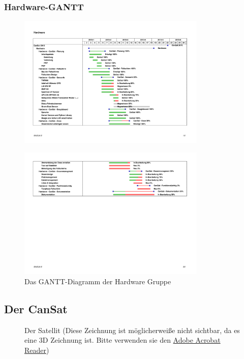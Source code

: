 \subsubsection {Hardware-GANTT}
\begin{figure}[htbp]
	\centering
	\includegraphics[trim = 10mm 50mm 20mm 65mm, clip,width=0.8\textwidth]{8_Anhang/hardware-gantt-1.png}
	\label{gantt_hardware_1}
\end{figure}
\vspace{-2cm}
\begin{figure}[htbp]
	\centering
	\includegraphics[trim = 11mm 350mm 20mm 40mm, clip,width=0.8\textwidth]{8_Anhang/hardware-gantt-2.png}
	\caption{Das GANTT-Diagramm der Hardware Gruppe}
	\label{gantt_hardware_2}
\end{figure}

\newpage
\subsection{Der CanSat}
\begin{figure}[h] 
      \centering 
      \caption{Der Satellit (Diese Zeichnung ist möglicherweiße nicht sichtbar, da es eine 3D Zeichnung ist. Bitte verwenden sie den \href{https://get.adobe.com/reader/?loc=de}{Adobe Acrobat Reader})}\label{fig:hla} 
\end{figure} 

